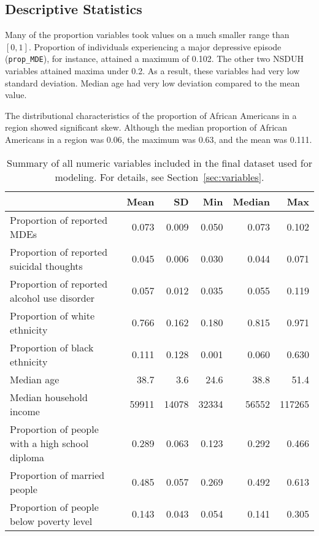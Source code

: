 \documentclass{article}
\begin{document}
\subsection{Descriptive Statistics}

Many of the proportion variables took values on a much smaller range
than $[0,1]$.
Proportion of individuals experiencing a major depressive episode
(\texttt{prop\_MDE}),
for instance, attained a maximum of 0.102.
The other two NSDUH variables attained maxima under 0.2.
As a result, these variables had very low standard deviation.
Median age had very low deviation compared to the mean value.

The distributional characteristics of the proportion of African Americans
in a region showed significant skew.
Although the median proportion of African Americans in a region was 0.06,
the maximum was 0.63, and the mean was 0.111.


\begin{table}[t]
\begin{center}
\begin{tabular}{l r r r r r}
    \toprule
    & Mean & SD & Min & Median & Max\\
    \midrule
    Proportion of reported MDEs & 0.073 & 0.009 & 0.050 & 0.073 & 0.102\\
    Proportion of reported suicidal thoughts & 0.045 & 0.006 & 0.030 & 0.044 & 0.071\\
    Proportion of reported alcohol use disorder & 0.057 & 0.012 & 0.035 & 0.055 & 0.119\\
    Proportion of white ethnicity & 0.766 & 0.162 & 0.180 & 0.815 & 0.971\\
    Proportion of black ethnicity & 0.111 & 0.128 & 0.001 & 0.060 & 0.630\\
    Median age & 38.7 & 3.6 & 24.6 & 38.8 & 51.4\\
    Median household income & 59911 & 14078 & 32334 & 56552 & 117265\\
    Proportion of people with a high school diploma & 0.289 & 0.063 & 0.123 & 0.292 & 0.466\\
    Proportion of married people & 0.485 & 0.057 & 0.269 & 0.492 & 0.613\\
    Proportion of people below poverty level & 0.143 & 0.043 & 0.054 & 0.141 & 0.305\\
    \bottomrule
\end{tabular}
\end{center}
\caption{\label{tab:summary}
Summary of
all numeric variables included in the final dataset used for modeling.
For details, see Section~\ref{sec:variables}.}
\end{table}
\end{document}
